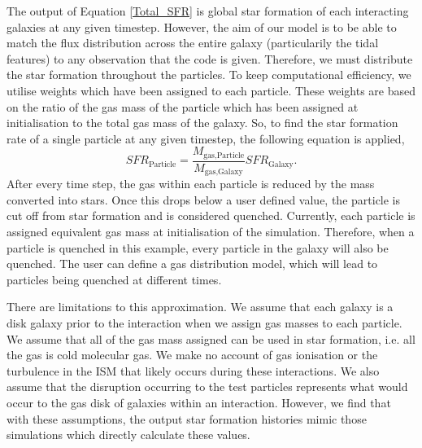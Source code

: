 The output of Equation \ref{Total_SFR} is global star formation of each interacting galaxies at any given timestep. However, the aim of our model is to be able to match the flux distribution across the entire galaxy (particularily the tidal features) to any observation that the code is given. Therefore, we must distribute the star formation throughout the particles. To keep computational efficiency, we utilise weights which have been assigned to each particle. These weights are based on the ratio of the gas mass of the particle which has been assigned at initialisation to the total gas mass of the galaxy. So, to find the star formation rate of a single particle at any given timestep, the following equation is applied,
\begin{equation}
    SFR_{\text{Particle}} = \frac{M_{\text{gas,Particle}}}{M_{\text{gas,Galaxy}}}SFR_{\text{Galaxy}}.
\end{equation}
After every time step, the gas within each particle is reduced by the mass converted into stars. Once this drops below a user defined value, the particle is cut off from star formation and is considered quenched. Currently, each particle is assigned equivalent gas mass at initialisation of the simulation. Therefore, when a particle is quenched in this example, every particle in the galaxy will also be quenched. The user can define a gas distribution model, which will lead to particles being quenched at different times.

There are limitations to this approximation. We assume that each galaxy is a disk galaxy prior to the interaction when we assign gas masses to each particle. We assume that all of the gas mass assigned can be used in star formation, i.e. all the gas is cold molecular gas. We make no account of gas ionisation or the turbulence in the ISM that likely occurs during these interactions. We also assume that the disruption occurring to the test particles represents what would occur to the gas disk of galaxies within an interaction. However, we find that with these assumptions, the output star formation histories mimic those simulations which directly calculate these values. 

